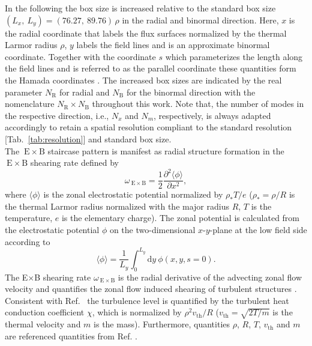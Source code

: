 \documentclass[aip, amsmath, amssymb, reprint, twocolumn, floatfix]{revtex4-1}
\newcommand{\wexb}{\omega_{\mathrm{\:E \times B}}}
\newcommand{\exb}{\mathrm{\:E}\times\mathrm{B}}
\newcommand{\NR}{N_\mathrm{R}}
\newcommand{\NB}{N_\mathrm{B}}
\newcommand{\rhoth}{\rho}
\newcommand{\vth}{v_{\mathrm{th}}}
\newcommand{\xcoord}{x}
\newcommand{\ycoord}{y}
\begin{document}
In the following the box size is increased relative to the standard box size $(L_\xcoord,~L_\ycoord) = (76.27,~89.76)\,\rhoth$ in the radial and binormal direction. Here, $\xcoord$ is the radial coordinate that labels the flux surfaces normalized by the thermal Larmor radius $\rhoth$, $\ycoord$ labels the field lines and is an approximate binormal coordinate. Together with the coordinate $s$ which parameterizes the length along the field lines and is referred to as the parallel coordinate these quantities form the Hamada coordinates \cite{Hamada1958}.
The increased box sizes are indicated by the real parameter $\NR$ for radial and $\NB$ for the binormal direction with the nomenclature $\NR\times \NB$ throughout this work.
Note that, the number of modes in the respective direction, i.e., $N_x$ and $N_m$, respectively, is always adapted accordingly to retain a spatial resolution compliant to the standard resolution [Tab.~\ref{tab:resolution}] and standard box size. \\
The $\exb$ staircase pattern is manifest as radial structure formation in the $\exb$ shearing rate defined by\cite{Rath2016, Pueschel2008, Rath2016, Peeters2016}
\begin{equation}
	\wexb = \frac{1}{2} \frac{\partial^2 \langle \phi \rangle}{\partial \xcoord^2},
	\label{eq:shearingrate}
\end{equation}
where $\langle \phi \rangle$ is the zonal electrostatic potential normalized by $\rho_\ast T/e$ ($\rho_\ast = \rhoth/R$ is the thermal Larmor radius normalized with the major radius $R$, $T$ is the temperature, $e$ is the elementary charge).
The zonal potential is calculated from the electrostatic potential $\phi$ on the two-dimensional $\xcoord$-$\ycoord$-plane at the low field side according to\cite{Rath2021}
\begin{equation}
\langle \phi \rangle = \frac{1}{L_\ycoord} \int_0^{L_\ycoord} \mathrm{d}\ycoord ~ \phi(\xcoord,\ycoord,s=0).
\end{equation}
The E$\times$B shearing rate $\wexb$ is the radial derivative of the advecting zonal flow velocity \cite{Hahm1995, Waltz1998} and quantifies the zonal flow induced shearing of turbulent structures \cite{Biglari1990, Hahm1995, Burnell1997}. \\
Consistent with Ref.~ the turbulence level is quantified by the turbulent heat conduction coefficient $\chi$, which is normalized by $\rhoth^2 \vth/R$ ($\vth = \sqrt{2 T/m}$ is the thermal velocity and $m$ is the mass). Furthermore, quantities $\rhoth$, $R$, $T$, $\vth$ and $m$ are referenced quantities from Ref. .
\end{document}
